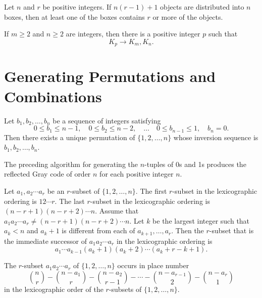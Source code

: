 \begin{corollary}
    \label{cor:3.2.2}
Let $n$ and $r$ be positive integers. If $n(r-1) + 1$
objects are distributed into $n$ boxes, then at least one of the boxes contains $r$ or more of the objects.
\end{corollary}

\begin{theorem}
    \label{thm:3.3.1}
If $m \geq 2$ and $n \geq 2$ are integers, then there is a positive integer $p$ such that
\[K_p \rightarrow K_m, K_n.\]
\end{theorem} 

\chapter{Generating Permutations and Combinations}

\begin{theorem}
    \label{thm:4.2.1}
Let $b_1, b_2, \dots, b_n$ be a sequence of integers satisfying
\[
0 \leq b_1 \leq n-1, \quad 0 \leq b_2 \leq n-2,\quad \dots \quad 0 \leq b_{n-1} \leq 1, \quad b_n = 0.
\]
Then there exists a unique permutation of $\{1, 2, \dots, n\}$ whose inversion sequence is $b_1, b_2, \dots, b_n$.
\end{theorem} 

\begin{theorem}
  \label{thm:4.3.1}
  The preceding algorithm for generating the $n$-tuples of 0s and 1s 
  produces the reflected Gray code of order $n$ for each positive integer $n$.
\end{theorem} 

\begin{theorem}
  \label{thm:4.4.1}
  Let $a_1, a_2 \cdots a_r$ be an $r$-subset of $\{1, 2, \dots, n\}$. 
  The first $r$-subset in the lexicographic ordering is $1 2 \cdots r$. The last $r$-subset 
  in the lexicographic ordering is $(n-r+1)(n-r+2) \cdots n$. Assume that 
  $a_1a_2 \cdots a_r \neq (n-r+1)(n-r+2) \cdots n$. Let $k$ be the largest integer such that 
  $a_k < n$ and $a_k + 1$ is different from each of $a_{k+1}, \dots, a_r$. Then the $r$-subset 
  that is the immediate successor of $a_1a_2 \cdots a_r$ in the lexicographic ordering is
  \[
  a_1 \cdots a_{k-1}(a_k + 1)(a_k + 2) \cdots (a_k + r - k + 1).
  \]
\end{theorem} 


\begin{theorem}
    \label{thm:4.4.2}
The $r$-subset $a_1a_2 \cdots a_r$ of $\{1, 2, \dots, n\}$ occurs in place number
\[
\binom{n}{r} - \binom{n - a_1}{r} - \binom{n - a_2}{r-1} - \cdots - \binom{n - a_{r-1}}{2} - \binom{n - a_r}{1}
\]
in the lexicographic order of the $r$-subsets of $\{1, 2, \dots, n\}$.
\end{theorem} 

